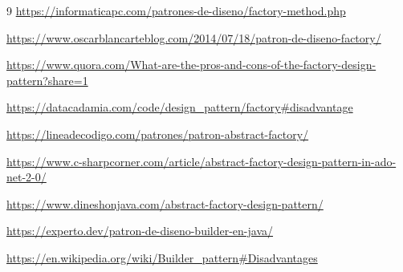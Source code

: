 \documentclass[letterpaper,11pt]{article}
\begin{document}
\begin{thebibliography} {9}
    \url{https://informaticapc.com/patrones-de-diseno/factory-method.php}

    \url{https://www.oscarblancarteblog.com/2014/07/18/patron-de-diseno-factory/}

    \url{https://www.quora.com/What-are-the-pros-and-cons-of-the-factory-design-pattern?share=1}

    \url{https://datacadamia.com/code/design_pattern/factory#disadvantage}

    \url{https://lineadecodigo.com/patrones/patron-abstract-factory/}

    \url{https://www.c-sharpcorner.com/article/abstract-factory-design-pattern-in-ado-net-2-0/}

    \url{https://www.dineshonjava.com/abstract-factory-design-pattern/}

    \url{https://experto.dev/patron-de-diseno-builder-en-java/}

    \url{https://en.wikipedia.org/wiki/Builder_pattern#Disadvantages}
\end{thebibliography}
\end{document}
